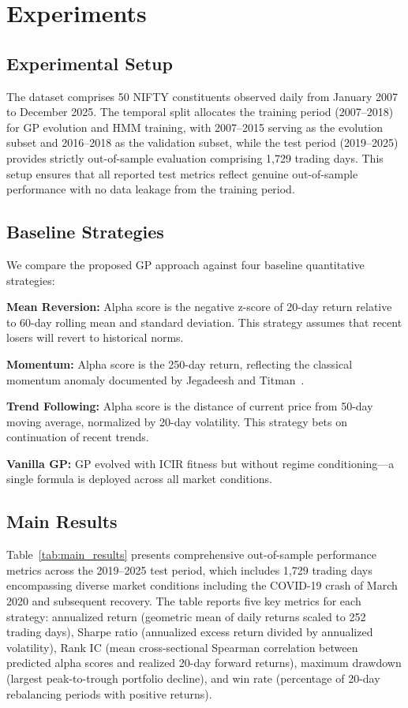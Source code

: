 \documentclass{ieeeaccess}
\begin{document}
\section{Experiments}
\label{sec:experiments}

\subsection{Experimental Setup}
The dataset comprises 50 NIFTY constituents observed daily from January 2007 to December 2025. The temporal split allocates the training period (2007--2018) for GP evolution and HMM training, with 2007--2015 serving as the evolution subset and 2016--2018 as the validation subset, while the test period (2019--2025) provides strictly out-of-sample evaluation comprising 1,729 trading days. This setup ensures that all reported test metrics reflect genuine out-of-sample performance with no data leakage from the training period.

\subsection{Baseline Strategies}
We compare the proposed GP approach against four baseline quantitative strategies:

\textbf{Mean Reversion:} Alpha score is the negative z-score of 20-day return relative to 60-day rolling mean and standard deviation. This strategy assumes that recent losers will revert to historical norms.

\textbf{Momentum:} Alpha score is the 250-day return, reflecting the classical momentum anomaly documented by Jegadeesh and Titman~\cite{b21}.

\textbf{Trend Following:} Alpha score is the distance of current price from 50-day moving average, normalized by 20-day volatility. This strategy bets on continuation of recent trends.

\textbf{Vanilla GP:} GP evolved with ICIR fitness but without regime conditioning---a single formula is deployed across all market conditions.

\subsection{Main Results}

Table~\ref{tab:main_results} presents comprehensive out-of-sample performance metrics across the 2019--2025 test period, which includes 1,729 trading days encompassing diverse market conditions including the COVID-19 crash of March 2020 and subsequent recovery. The table reports five key metrics for each strategy: annualized return (geometric mean of daily returns scaled to 252 trading days), Sharpe ratio (annualized excess return divided by annualized volatility), Rank IC (mean cross-sectional Spearman correlation between predicted alpha scores and realized 20-day forward returns), maximum drawdown (largest peak-to-trough portfolio decline), and win rate (percentage of 20-day rebalancing periods with positive returns).
\end{document}
